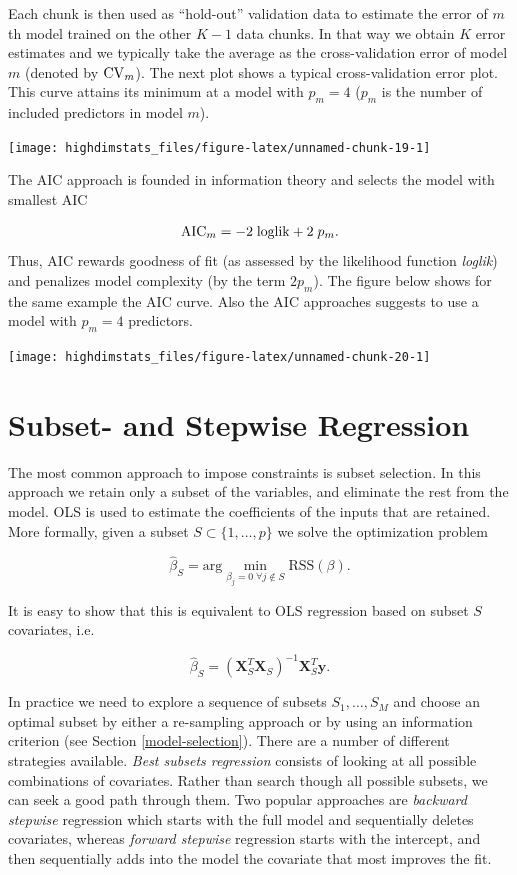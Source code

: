\documentclass[
]{book}
\begin{document}
Each chunk is then used as ``hold-out'' validation data to estimate the error of \(m\)th model trained on the other \(K-1\) data chunks. In that way we obtain \(K\) error estimates and we typically take the average as the cross-validation error of model \(m\) (denoted by \({\rm CV}_m\)). The next plot shows a typical cross-validation error plot. This curve attains its minimum at a model with \(p_m=4\) (\(p_m\) is the number of included predictors in model \(m\)).

\begin{center}\texttt{[image: highdimstats\_files/figure-latex/unnamed-chunk-19-1]} \end{center}

The AIC approach is founded in information theory and selects the model with smallest AIC

\[
{\rm AIC}_m=-2\;{\rm loglik}+2\;p_{m}.
\]
Thus, AIC rewards goodness of fit (as assessed by the likelihood function \emph{loglik}) and penalizes model complexity (by the term \(2 p_m\)). The figure below shows for the same example the AIC curve. Also the AIC approaches suggests to use a model with \(p_m=4\) predictors.

\begin{center}\texttt{[image: highdimstats\_files/figure-latex/unnamed-chunk-20-1]} \end{center}

\hypertarget{subset--and-stepwise-regression}{%
\section{Subset- and Stepwise Regression}\label{subset--and-stepwise-regression}}

The most common approach to impose constraints is subset selection. In this approach we retain only a subset of the variables, and eliminate the rest from the model. OLS is used to estimate the coefficients of the inputs that are retained. More formally, given a subset \(S\subset\{1,\ldots,p\}\) we solve the optimization problem

\[
\hat{\beta}_{S}=\text{arg}\!\!\!\!\!\min\limits_{\beta_j=0\;\forall j\notin S}\!\!\!\textrm{RSS}(\beta).
\]

It is easy to show that this is equivalent to OLS regression based on subset \(S\) covariates, i.e.

\[
\hat{\beta}_{S}=(\textbf{X}_S^T \textbf{X}_S)^{-1}\textbf{X}_S^T \textbf{y}.
\]

In practice we need to explore a sequence of subsets \(S_1,\ldots,S_M\) and choose an optimal subset by either a re-sampling approach or by using an information criterion (see Section \ref{model-selection}). There are a number of different strategies available. \emph{Best subsets regression} consists of looking at all possible combinations of covariates. Rather than search though all possible subsets, we can seek a good path through them. Two popular approaches are \emph{backward stepwise} regression which starts with the full model and sequentially deletes covariates, whereas \emph{forward stepwise} regression starts with the intercept, and then sequentially adds into the model the covariate that most improves the fit.
\end{document}
